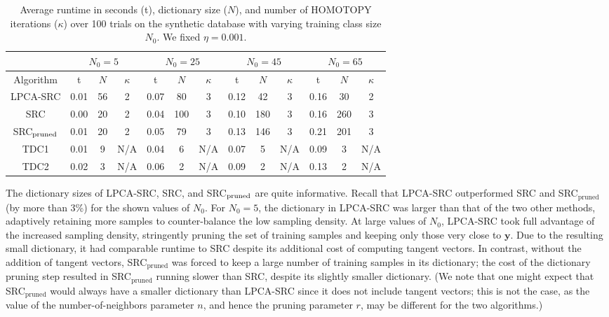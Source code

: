 \documentclass[review]{elsarticle}
\begin{document}
\begin{table}[!htb] 
\small{
\centering
\begin{tabular}{|c|c|c|c|c|c|c|c|c|c|c|c|c|}
\hline
& \multicolumn{3}{|c|}{$N_0 = 5$}    & \multicolumn{3}{|c|}{$N_0 = 25$}   & \multicolumn{3}{|c|}{$N_0 = 45$}    & \multicolumn{3}{|c|}{$N_0 = 65$}   \\
\hline
Algorithm & t & $N$ & $\kappa$ & t & $N$ & $\kappa$ & t & $N$ & $\kappa$ & t & $N$ & $\kappa$ \\
\hline
LPCA-SRC	&	0.01	&	56	&	2	&	0.07	&	80	&	3	&	0.12	&	42	&	3	&	0.16	&	30	&	2	\\
SRC	&	0.00	&	20	&	2	&	0.04	&	100	&	3	&	0.10	&	180	&	3	&	0.16	&	260	&	3	\\
SRC$_\mathrm{\textnormal{pruned}}$	&	0.01	&	20	&	2	&	0.05	&	79	&	3	&	0.13	&	146	&	3	&	0.21	&	201	&	3	\\
TDC1	&	0.01	&	9	&	N/A	&	0.04	&	6	&	N/A	&	0.07	&	5	&	N/A	&	0.09	&	3	&	N/A	\\
TDC2	&	0.02	&	3	&	N/A	&	0.06	&	2	&	N/A	&	0.09	&	2	&	N/A	&	0.13	&	2	&	N/A	\\
\hline
\end{tabular}
\caption{Average runtime in seconds (t), dictionary size ($N$), and number of HOMOTOPY iterations ($\kappa$) over 100 trials on the synthetic database with varying training class size $N_0$. We fixed $\eta = 0.001$.}
\label{table:syn_time}}
\end{table}



The dictionary sizes of LPCA-SRC, SRC, and SRC$_\mathrm{\textnormal{pruned}}$ are quite informative. Recall that LPCA-SRC outperformed SRC and SRC$_\mathrm{pruned}$ (by more than 3\%) for the shown values of $N_0$. For $N_0 = 5$, the dictionary in LPCA-SRC was larger than that of the two other methods, adaptively retaining more samples to counter-balance the low sampling density. At large values of $N_0$, LPCA-SRC took full advantage of the increased sampling density, stringently pruning the set of training samples and keeping only those very close to $\bm{y}$. Due to the resulting small dictionary, it had comparable runtime to SRC despite its additional cost of computing tangent vectors. In contrast, without the addition of tangent vectors, SRC$_\mathrm{pruned}$ was forced to keep a large number of training samples in its dictionary; the cost of the dictionary pruning step resulted in SRC$_\mathrm{pruned}$ running slower than SRC, despite its slightly smaller dictionary. (We note that one might expect that SRC$_\mathrm{pruned}$ would always have a smaller dictionary than LPCA-SRC since it does not include tangent vectors; this is not the case, as the value of the number-of-neighbors parameter $n$, and hence the pruning parameter $r$, may be different for the two algorithms.)
\end{document}
